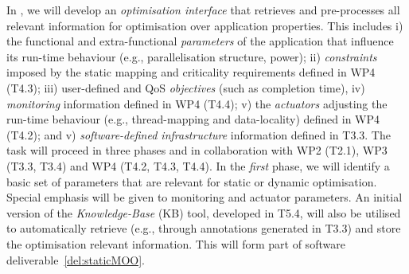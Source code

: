 \begin{Workpackage}{\thewpno}
\begin{Task}
In \theTask, we will develop an \emph{optimisation interface} that retrieves and pre-processes all 
relevant information for optimisation over application properties. This includes 
i) the functional and extra-functional \emph{parameters} of the application that influence its run-time behaviour (e.g., parallelisation structure, power); ii) \emph{constraints} imposed by the static mapping and criticality requirements defined in WP4 (T4.3); iii) user-defined and QoS \emph{objectives} (such as completion time), iv) \emph{monitoring} information defined in WP4 (T4.4); v) the \emph{actuators} adjusting the run-time behaviour (e.g., thread-mapping and data-locality) defined in WP4 (T4.2); and v) \emph{software-defined  infrastructure} information defined in T3.3. The task will proceed in three phases and in collaboration with WP2 (T2.1), WP3 (T3.3, T3.4) and WP4 (T4.2, T4.3, T4.4). In the \emph{first} phase,  we will identify a basic set of parameters that are relevant for static or dynamic optimisation. Special emphasis will be given to monitoring and actuator parameters. An initial version of the \emph{Knowledge-Base} (KB) tool, developed in T5.4, will also be utilised to automatically retrieve (e.g., through annotations generated in T3.3) and store the optimisation relevant information. This will form part of software deliverable~\ref{del:staticMOO}.
%
%

\end{Task}
\end{Workpackage}
